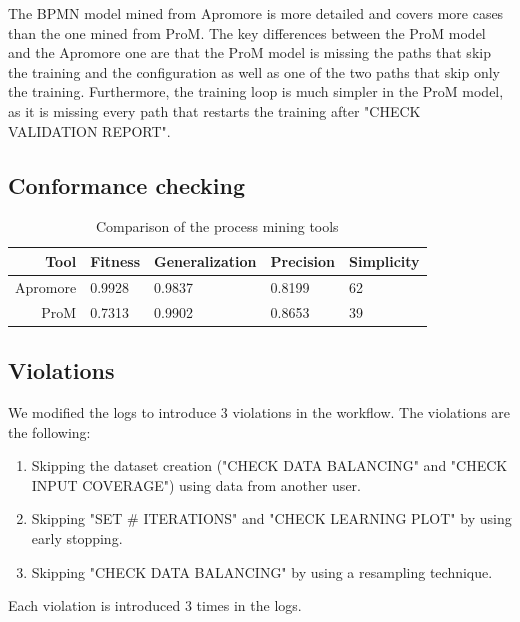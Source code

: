 The BPMN model mined from Apromore is more detailed and
covers more cases than the one mined from ProM.
The key differences between the ProM model and the Apromore one are that the
ProM model is missing the paths that skip
the training and the configuration as well as one of the two paths that skip only
the training. Furthermore, the training loop is much simpler in the ProM model, as
it is missing every path that restarts the training after
"CHECK VALIDATION REPORT".

\subsection{Conformance checking}

\begin{table}[H]
\centering
\begin{tabular}{|r|l|l|l|l|}
\hline
\textbf{Tool} & \textbf{Fitness} & \textbf{Generalization} & \textbf{Precision} & \textbf{Simplicity} \\
\hline
Apromore & 0.9928 & 0.9837 & 0.8199 & 62 \\
\hline
ProM & 0.7313 & 0.9902 & 0.8653 & 39 \\
\hline
\end{tabular}
\caption{Comparison of the process mining tools}
\label{tab:process_mining_comparison}
\end{table}

\subsection{Violations}

We modified the logs to introduce 3 violations in the workflow. The
violations are the following:
\begin{enumerate}
    \item Skipping the dataset creation ("CHECK DATA BALANCING"
        and "CHECK INPUT COVERAGE") using data from another user.
    \item Skipping "SET \# ITERATIONS" and "CHECK LEARNING PLOT" by
        using early stopping.
    \item Skipping "CHECK DATA BALANCING" by using a resampling
        technique.
\end{enumerate}

Each violation is introduced 3 times in the logs.

